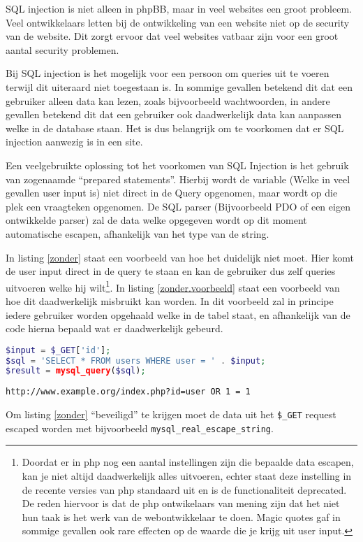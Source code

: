 SQL injection is niet alleen in phpBB, maar in veel websites een groot probleem. Veel ontwikkelaars letten bij de ontwikkeling van een website niet op de security van de website. Dit zorgt ervoor dat veel websites vatbaar zijn voor een groot aantal security problemen.

Bij SQL injection is het mogelijk voor een persoon om queries uit te voeren terwijl dit uiteraard niet toegestaan is. In sommige gevallen betekend dit dat een gebruiker alleen data kan lezen, zoals bijvoorbeeld wachtwoorden, in andere gevallen betekend dit dat een gebruiker ook daadwerkelijk data kan aanpassen welke in de database staan. Het is dus belangrijk om te voorkomen dat er SQL injection aanwezig is in een site.

Een veelgebruikte oplossing tot het voorkomen van SQL Injection is het gebruik van zogenaamde ``prepared statements''. Hierbij wordt de variable (Welke in veel gevallen user input is) niet direct in de Query opgenomen, maar wordt op die plek een vraagteken opgenomen. De SQL parser (Bijvoorbeeld PDO of een eigen ontwikkelde parser) zal de data welke opgegeven wordt op dit moment automatische escapen, afhankelijk van het type van de string.

In listing \ref{zonder} staat een voorbeeld van hoe het duidelijk niet moet. Hier komt de user input direct in de query te staan en kan de gebruiker dus zelf queries uitvoeren welke hij wilt\footnote{Doordat er in php nog een aantal instellingen zijn die bepaalde data escapen, kan je niet altijd daadwerkelijk alles uitvoeren, echter staat deze instelling in de recente versies van php standaard uit\cite{bib.php.magic} en is de functionaliteit deprecated. De reden hiervoor is dat de php ontwikelaars van mening zijn dat het niet hun taak is het werk van de webontwikkelaar te doen. Magic quotes gaf in sommige gevallen ook rare effecten op de waarde die je krijg uit user input.}. In listing \ref{zonder.voorbeeld} staat een voorbeeld van hoe dit daadwerkelijk misbruikt kan worden. In dit voorbeeld zal in principe iedere gebruiker worden opgehaald welke in de tabel staat, en afhankelijk van de code hierna bepaald wat er daadwerkelijk gebeurd.
\begin{lstlisting}[language=php,label=zonder,caption=Zonder escaping, veel gebruikt]
$input = $_GET['id'];
$sql = 'SELECT * FROM users WHERE user = ' . $input;
$result = mysql_query($sql);
\end{lstlisting}
\begin{lstlisting}[label=zonder.voorbeeld,caption=Voorbeeld van misbruiken van niet gescapede data]
http://www.example.org/index.php?id=user OR 1 = 1
\end{lstlisting}
Om listing \ref{zonder} ``beveiligd'' te krijgen moet de data uit het \texttt{\$\_GET} request escaped worden met bijvoorbeeld \texttt{mysql\_real\_escape\_string}. 

